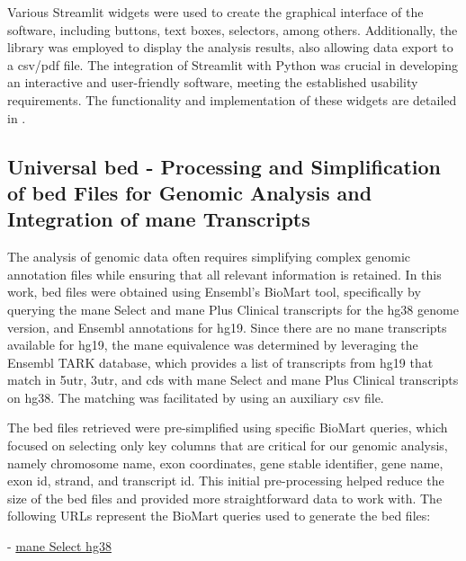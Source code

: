 Various Streamlit widgets were used to create the graphical interface of the software, including buttons, text boxes, selectors, among others. Additionally, the library was employed to display the analysis results, also allowing data export to a \ac{csv}/\ac{pdf} file. The integration of Streamlit with Python was crucial in developing an interactive and user-friendly software, meeting the established usability requirements. The functionality and implementation of these widgets are detailed in \cite{streamlit_doc}.

\subsection{Universal \ac{bed} - Processing and Simplification of \ac{bed} Files for Genomic Analysis and Integration of \ac{mane} Transcripts}

The analysis of genomic data often requires simplifying complex genomic annotation files while ensuring that all relevant information is retained. In this work, \ac{bed} files were obtained using Ensembl's BioMart \cite{BioMart} tool, specifically by querying the \ac{mane} Select and \ac{mane} Plus Clinical \cite{Morales2022} transcripts for the \ac{hg38} genome version, and Ensembl annotations for \ac{hg19}. Since there are no \ac{mane} transcripts available for \ac{hg19}, the \ac{mane} equivalence was determined by leveraging the Ensembl TARK \cite{tark} database, which provides a list of transcripts from \ac{hg19} that match in \ac{5utr}, \ac{3utr}, and \ac{cds} with \ac{mane} Select and \ac{mane} Plus Clinical transcripts on \ac{hg38}. The matching was facilitated by using an auxiliary \ac{csv} file.

The \ac{bed} files retrieved were pre-simplified using specific BioMart queries, which focused on selecting only key columns that are critical for our genomic analysis, namely chromosome name, exon coordinates, gene stable identifier, gene name, exon \ac{id}, strand, and transcript \ac{id}. This initial pre-processing helped reduce the size of the \ac{bed} files and provided more straightforward data to work with. The following URLs represent the BioMart queries used to generate the \ac{bed} files:

- \href{http://www.ensembl.org/biomart/martview/a07a268477bc2307cce8fde9f6a88a1b?VIRTUALSCHEMANAME=default&ATTRIBUTES=hsapiens_gene_ensembl.default.structure.chromosome_name|hsapiens_gene_ensembl.default.structure.exon_chrom_start|hsapiens_gene_ensembl.default.structure.exon_chrom_end|hsapiens_gene_ensembl.default.structure.ensembl_gene_id_version|hsapiens_gene_ensembl.default.structure.external_gene_name|hsapiens_gene_ensembl.default.structure.ensembl_exon_id|hsapiens_gene_ensembl.default.structure.strand|hsapiens_gene_ensembl.default.structure.ensembl_transcript_id_version&FILTERS=hsapiens_gene_ensembl.default.filters.mane_select.only&VISIBLEPANEL=resultspanel}{\ac{mane} Select \ac{hg38}}

